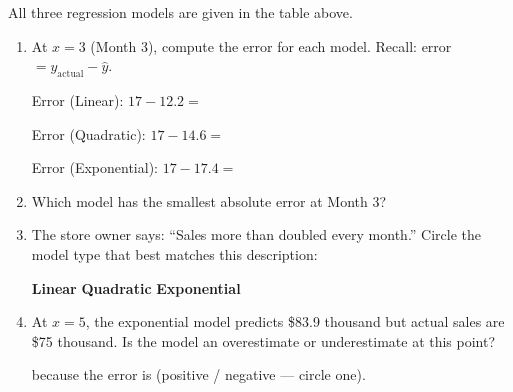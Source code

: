 \documentclass[10pt]{article}
\begin{document}
\begin{tcolorbox}[colback=white, colframe=black!40,
    title=\textbf{Tier R --- Remediate},
    fonttitle=\bfseries, arc=2mm, left=3mm, right=3mm, top=2mm, bottom=2mm]

All three regression models are given in the table above.

\begin{enumerate}[itemsep=10pt]
  \item At $x = 3$ (Month 3), compute the error for each model.
        Recall: error $= y_{\text{actual}} - \hat{y}$.

        \vspace{0.04in}
        Error (Linear): $17 - 12.2 = $ \blank{3cm}

        Error (Quadratic): $17 - 14.6 = $ \blank{3cm}

        Error (Exponential): $17 - 17.4 = $ \blank{3cm}

  \item Which model has the smallest absolute error at Month 3? \blank{5cm}

  \item The store owner says: ``Sales more than doubled every month.'' Circle the model
        type that best matches this description:

        \hspace{2cm} \textbf{Linear} \hspace{2cm} \textbf{Quadratic} \hspace{2cm} \textbf{Exponential}

  \item At $x = 5$, the exponential model predicts \$83.9 thousand but actual sales are
        \$75 thousand. Is the model an overestimate or underestimate at this point?

        \vspace{0.04in}
        \blank{4cm} \quad because the error is \blank{2cm} (positive / negative --- circle one).
\end{enumerate}
\end{tcolorbox}

\vspace{0.1in}
\end{document}
